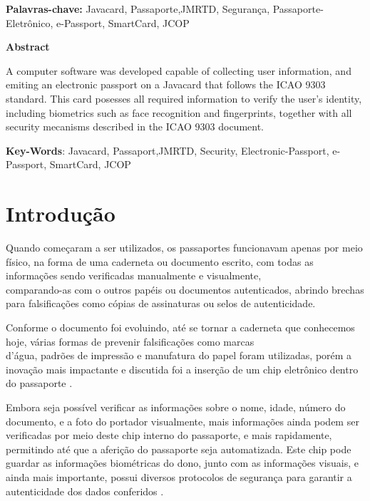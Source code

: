 \documentclass[11pt]{article}
\begin{document}
	\vspace*{10px}
        \noindent \textbf{Palavras-chave:} Javacard, Passaporte,JMRTD, Segurança, Passaporte-Eletrônico, e-Passport, SmartCard, JCOP
		
    \hspace{2em}

	\large \textbf{Abstract}
		
    \hspace{1em}

		A computer software was developed capable of collecting user information, and emiting an electronic passport on a Javacard that follows the ICAO 9303 standard. This card posesses all required information to verify the user's identity, including biometrics such as face recognition and fingerprints, together with all security mecanisms described in the ICAO 9303 document.

	\vspace*{10px}
        \noindent \textbf{Key-Words}: Javacard, Passaport,JMRTD, Security, Electronic-Passport, e-Passport, SmartCard, JCOP

		
	
	\newpage

	\tableofcontents
	\listoffigures
	\newpage
	

	\section{Introdução}
		
			
			Quando começaram a ser utilizados, os passaportes funcionavam apenas por meio físico, na forma de uma caderneta ou documento escrito, com todas as informações sendo verificadas manualmente e visualmente, \\comparando-as com o outros papéis ou documentos autenticados, abrindo brechas para falsificações como cópias de assinaturas ou selos de autenticidade. 
			
			Conforme o documento foi evoluindo, até se tornar a caderneta que conhecemos hoje, várias formas de prevenir falsificações como marcas \\d’água, padrões de impressão e manufatura do papel foram utilizadas, porém a inovação mais impactante e discutida foi a inserção de um chip eletrônico dentro do passaporte \parencite{PF}. 
			
			Embora seja possível verificar as informações sobre o nome, idade, número do documento, e a foto do portador visualmente, mais informações ainda podem ser verificadas por meio deste chip interno do passaporte, e mais rapidamente, permitindo até que a aferição do passaporte seja automatizada. Este chip pode guardar as informações biométricas do dono, junto com as informações visuais, e ainda mais importante, possui diversos protocolos de segurança para garantir a autenticidade dos dados conferidos \parencite{HOWPASSPORT}.
			
\end{document}
